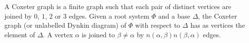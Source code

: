 A Coxeter graph is a finite graph such that each pair of distinct vertices are joined
by $0$, $1$, $2$ or $3$ edges. Given a root system $\Phi$ and a base $\Delta$,
the Coxeter graph (or unlabelled Dynkin diagram) of $\Phi$ with respect to $\Delta$
has as vertices the element of $\Delta$. A vertex $\alpha$ is joined to $\beta\neq \alpha$ by
$n(\alpha, \beta)n(\beta, \alpha)$ edges.
